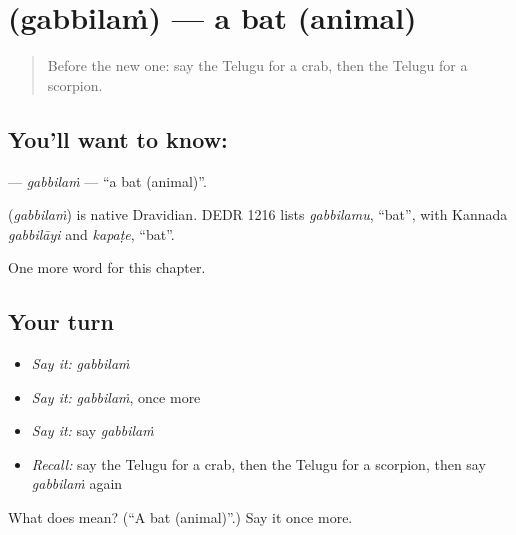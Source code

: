 \section[\texorpdfstring{\te{గబ్బిలం} (gabbilaṁ)}{గబ్బిలం (gabbilaṁ)}]{ (gabbilaṁ) — a bat (animal)}

\label{lesson:TE-C228-gabbilam}



\begin{quote}
Before the new one: say the Telugu for a crab, then the Telugu for a scorpion.
\end{quote}

\subsection*{You'll want to know: }
\textbf{} — \emph{gabbilaṁ} — \textquotedblleft{}a bat (animal)\textquotedblright{}.

\begin{cousinweb}
\textbf{} (\emph{gabbilaṁ}) is native Dravidian. DEDR 1216 lists \emph{gabbilamu}, \textquotedblleft{}bat\textquotedblright{}, with Kannada \emph{gabbilāyi} and \emph{kapaṭe}, \textquotedblleft{}bat\textquotedblright{}.
\end{cousinweb}

\begin{grammarlens}[title={What you've built}]
One more word for this chapter.
\end{grammarlens}

\subsection*{Your turn}
\begin{itemize}
\raggedright
  \item \emph{Say it:} \emph{gabbilaṁ}
  \item \emph{Say it:} \emph{gabbilaṁ}, once more
  \item \emph{Say it:} say \emph{gabbilaṁ}
  \item \emph{Recall:} say the Telugu for a crab, then the Telugu for a scorpion, then say \emph{gabbilaṁ} again
\end{itemize}

\begin{tcolorbox}[breakable,colback=teal!4,colframe=teal!35!black,title={Before you move on}]
What does  mean? (\textquotedblleft{}A bat (animal)\textquotedblright{}.) Say it once more.
\end{tcolorbox}
